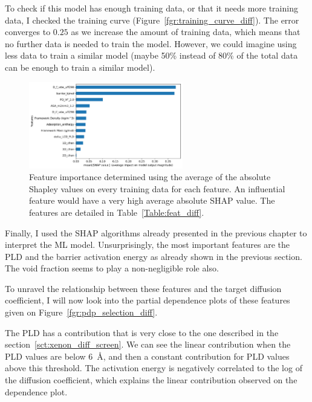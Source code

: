 \documentclass[main]{subfiles}
\begin{document}
To check if this model has enough training data, or that it needs more training data, I checked the training curve (Figure~\ref{fgr:training_curve_diff}). The error converges to $0.25$ as we increase the amount of training data, which means that no further data is needed to train the model. However, we could imagine using less data to train a similar model (maybe 50\% instead of 80\% of the total data can be enough to train a similar model). 

\begin{figure}[ht]
  \centering
  \includegraphics[width=0.6\textwidth]{figures/5-diffusion/Diff_Feature_importance_shapbased.pdf}
  \caption{ Feature importance determined using the average of the absolute Shapley values on every training data for each feature. An influential feature would have a very high average absolute SHAP value. The features are detailed in Table~\ref{Table:feat_diff}. }\label{fgr:feat_imp_diff}
\end{figure}

Finally, I used the SHAP algorithms already presented in the previous chapter to interpret the ML model. Unsurprisingly, the most important features are the PLD and the barrier activation energy as already shown in the previous section. The void fraction seems to play a non-negligible role also.

To unravel the relationship between these features and the target diffusion coefficient, I will now look into the partial dependence plots of these features given on Figure~\ref{fgr:pdp_selection_diff}. 

The PLD has a contribution that is very close to the one described in the section~\ref{sct:xenon_diff_screen}. We can see the linear contribution when the PLD values are below \SI{6}{\angstrom}, and then a constant contribution for PLD values above this threshold. The activation energy is negatively correlated to the log of the diffusion coefficient, which explains the linear contribution observed on the dependence plot. 
\end{document}
